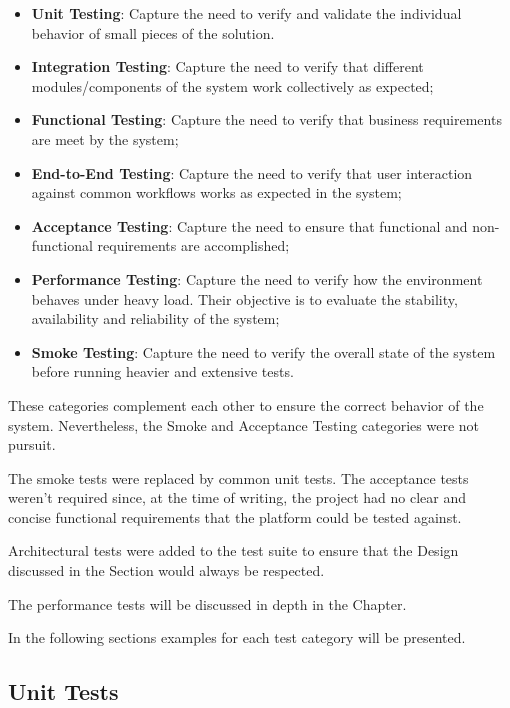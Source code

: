 \begin{itemize}
    \item \textbf{Unit Testing}: Capture the need to verify and validate the individual behavior of small pieces of the solution.
    \item \textbf{Integration Testing}: Capture the need to verify that different modules/components of the system work collectively as expected;
    \item \textbf{Functional Testing}: Capture the need to verify that business requirements are meet by the system;
    \item \textbf{End-to-End Testing}: Capture the need to verify that user interaction against common workflows works as expected in the system;
    \item \textbf{Acceptance Testing}: Capture the need to ensure that functional and non-functional requirements are accomplished;
    \item \textbf{Performance Testing}: Capture the need to verify how the environment behaves under heavy load. Their objective is to evaluate the stability, availability and reliability of the system;
    \item \textbf{Smoke Testing}: Capture the need to verify the overall state of the system before running heavier and extensive tests.
\end{itemize}

These categories complement each other to ensure the correct behavior of the system. Nevertheless, the Smoke and Acceptance Testing categories were not pursuit.

The smoke tests were replaced by common unit tests. The acceptance tests weren't required since, at the time of writing, the project had no clear and concise functional requirements that the platform could be tested against.

Architectural tests were added to the test suite to ensure that the Design discussed in the  Section would always be respected.

The performance tests will be discussed in depth in the  Chapter.

In the following sections examples for each test category will be presented.

\subsection{Unit Tests}
\label{subsec:implementation:tests:unit}

